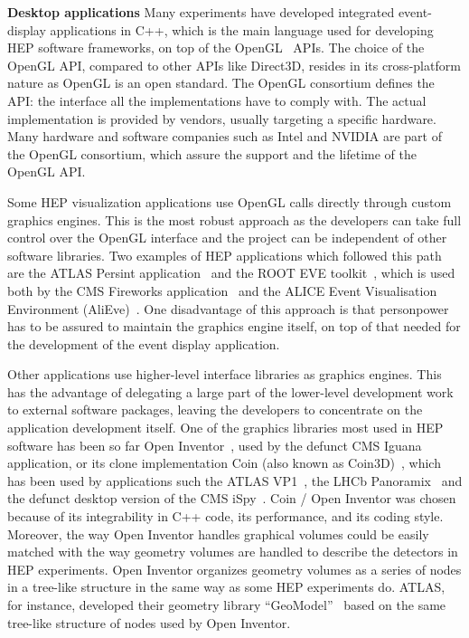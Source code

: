 \documentclass[12pt,a4paper]{article}
\begin{document}
{\bf Desktop applications} Many experiments have developed integrated event-display applications in C++, which is the main language used for developing
HEP software frameworks, on top of the OpenGL~\cite{OpenGL1992} APIs.
The choice of the OpenGL API, compared to other APIs like Direct3D, resides in its cross-platform nature as
OpenGL is an open standard. The OpenGL consortium defines the API: the interface all the implementations have to
comply with. The actual implementation is provided by vendors, usually targeting a specific hardware. Many hardware and
software companies such as Intel and NVIDIA are part of the OpenGL consortium, which assure
the support and the lifetime of the OpenGL API.

Some HEP visualization applications use OpenGL calls directly through custom graphics engines. This is the most
robust approach as the developers can take full control over the OpenGL interface
and the project can be independent of other software libraries. Two examples of  HEP applications which followed this path are the
ATLAS Persint application~\cite{ATLASPersint2012} and the ROOT EVE toolkit~\cite{ROOTEVE2007}, which is used both by the CMS
Fireworks application~\cite{CMSFireworks} and the ALICE Event Visualisation Environment (AliEve)~\cite{alieve}.
One disadvantage of this approach is that personpower has to be assured to maintain the graphics engine itself, on top of that needed for the development of the event display application.


Other applications use higher-level interface libraries as graphics engines. This has the advantage of delegating
a large part of the lower-level development work to external software packages, leaving the developers to concentrate
on the application development itself. One of the graphics libraries most used in HEP software has been so far
Open Inventor~\cite{OpenInventor1993}, used by the defunct CMS Iguana~\cite{CMSIguanaPaperNIM,CMSIguana} application, or its clone implementation
Coin (also known as Coin3D)~\cite{Coin3D}, which has been used by applications such the ATLAS VP1~\cite{ATLASVP12010},
the LHCb Panoramix~\cite{LHCbPanoramix} and the defunct desktop version of the CMS iSpy~\cite{CMSISpy}. Coin / Open Inventor was
chosen because of its integrability in C++ code, its performance, and its coding style. Moreover, the way Open Inventor handles
graphical volumes could be easily matched with the way geometry volumes are handled to describe the detectors in HEP experiments.
Open Inventor organizes geometry volumes as a series of nodes in a tree-like structure in the same way as some
HEP experiments do. ATLAS, for instance, developed their geometry library “GeoModel”~\cite{ATLASGeoModel2004} based on
the same tree-like structure of nodes used by Open Inventor.
\end{document}
